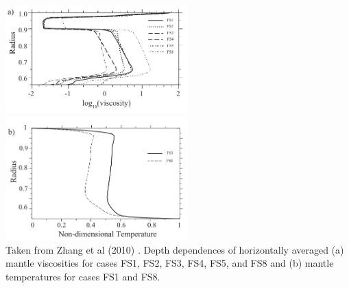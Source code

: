 \begin{center}
\includegraphics[width=7cm]{python_codes/fieldstone_88/images/zhzl10a}
\includegraphics[width=7cm]{python_codes/fieldstone_88/images/zhzl10b}\\
{\captionfont Taken from Zhang et al (2010) \cite{zhzl10}.
Depth dependences of horizontally averaged
(a) mantle viscosities for cases FS1, FS2, FS3, FS4, FS5,
and FS8 and (b) mantle temperatures for cases FS1 and FS8.}
\end{center}




\vspace{2cm}


